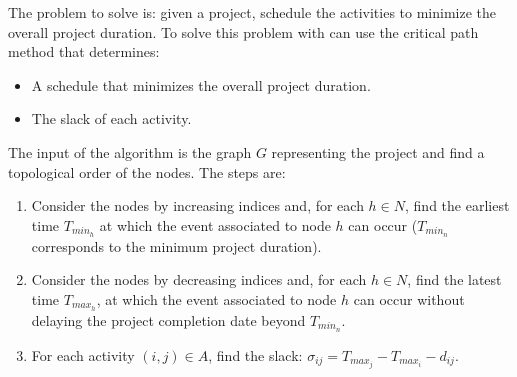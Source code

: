 \documentclass[12pt, a4paper]{report}
\begin{document}
    The problem to solve is: given a project, schedule the activities to minimize the overall project duration. To solve this problem with can use the critical path method that
    determines: 
    \begin{itemize}
        \item A schedule that minimizes the overall project duration. 
        \item The slack of each activity. 
    \end{itemize}
    The input of the algorithm is the graph $G$ representing the project and find a topological order of the nodes. The steps are: 
    \begin{enumerate}
        \item Consider the nodes by increasing indices and, for each $h \in N$, find the earliest time $T_{min_h}$ at which the event associated to node $h$ can occur
            ($T_{min_n}$ corresponds to the minimum project duration). 
        \item Consider the nodes by decreasing indices and, for each $h \in N$, find the latest time $T_{max_h}$, at which the event associated to node $h$ can occur
            without delaying the project completion date beyond $T_{min_n}$. 
        \item For each activity $(i,j) \in A$, find the slack: $\sigma_{ij}=T_{max_j}-T_{max_i}-d_{ij}$. 
    \end{enumerate}
\end{document}
